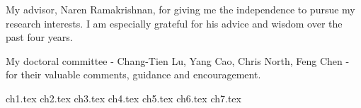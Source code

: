 \documentclass[12pt,dvips]{report}
\begin{document}
My advisor, Naren Ramakrishnan, for giving me the independence to pursue my research interests. I am especially grateful for his advice and wisdom over the past four years.

My doctoral committee - Chang-Tien Lu, Yang Cao, Chris North, Feng Chen - for their valuable
comments, guidance and encouragement.


\tableofcontents
\pagebreak

\listoffigures
\pagebreak

\listoftables
\pagebreak

\pagestyle{myheadings}

{ch1.tex}
{ch2.tex}
{ch3.tex}
{ch4.tex}
{ch5.tex}
{ch6.tex}
{ch7.tex}



%





\end{document}

